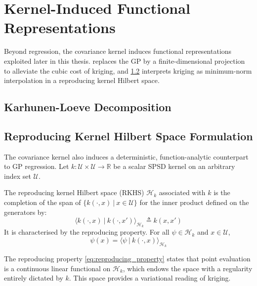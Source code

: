 \section{Kernel-Induced Functional Representations}\label{sec:functional_representations}

Beyond regression, the covariance kernel induces functional representations exploited later in this thesis.  replaces the GP by a finite-dimensional projection to alleviate the cubic cost of kriging, and \cref{sec:RKHS} interprets kriging as minimum-norm interpolation in a reproducing kernel Hilbert space.

\subsection{Karhunen-Loeve Decomposition}

\subsection{Reproducing Kernel Hilbert Space Formulation}\label{sec:RKHS}

The covariance kernel also induces a deterministic, function-analytic counterpart to GP regression. Let $k:\mathcal{U}\times\mathcal{U}\to\mathbb{R}$ be a scalar SPSD kernel on an arbitrary index set $\mathcal{U}$.

\begin{definition}\label{th:RKHS}
	The reproducing kernel Hilbert space (RKHS) $\mathcal{H}_k$ associated with $k$ is the completion of the span of $\{k(\cdot,x)\:|\:x\in\mathcal{U}\}$ for the inner product defined on the generators by:
	\begin{equation}
		\langle k(\cdot,x)\:|\:k(\cdot,x')\rangle_{\mathcal{H}_k}\triangleq k(x,x')
	\end{equation}
	It is characterised by the reproducing property. For all $\psi\in\mathcal{H}_k$ and $x\in\mathcal{U}$,
	\begin{equation}
		\psi(x)=\langle\psi\:|\:k(\cdot,x)\rangle_{\mathcal{H}_k}\label{eq:reproducing_property}
	\end{equation}
\end{definition}

The reproducing property \eqref{eq:reproducing_property} states that point evaluation is a continuous linear functional on $\mathcal{H}_k$, which endows the space with a regularity entirely dictated by $k$. This space provides a variational reading of kriging.

